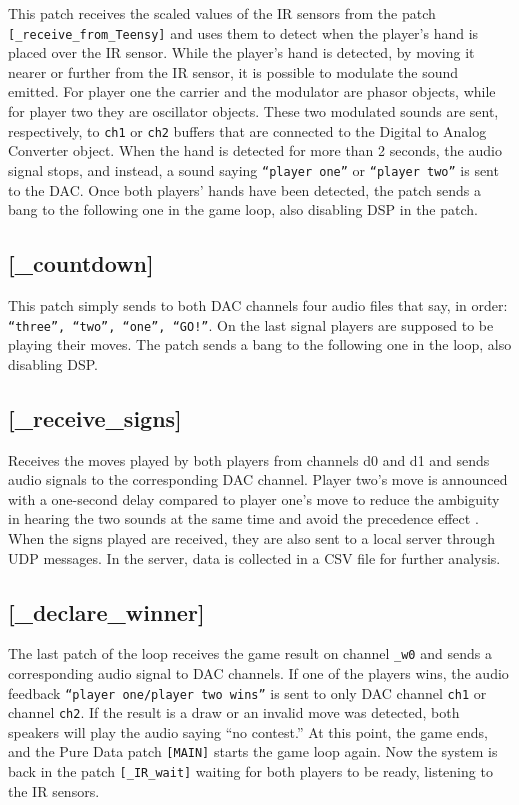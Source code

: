 \documentclass[11pt,a4paper]{report}
\begin{document}
This patch receives the scaled values of the IR sensors from the patch 
\texttt{[\_receive\_from\_Teensy]}
and uses them to detect when the player's hand is placed over the IR sensor. While the player's hand is detected, by moving it nearer or further from the IR sensor, it is possible to modulate the sound emitted. For player one the carrier and the modulator are phasor objects, while for player two they are oscillator objects. These two modulated sounds are sent, respectively, to \texttt{ch1} or \texttt{ch2} buffers that are connected to the Digital to Analog Converter object. When the hand is detected for more than 2 seconds, the audio signal stops, and instead, a sound saying \texttt{“player one”} or \texttt{“player two”} is sent to the DAC. Once both players' hands have been detected, the patch sends a bang to the following one in the game loop, also disabling DSP in the patch.

\subsection*{\textbf{[\_countdown]}}
This patch simply sends to both DAC channels four audio files that say, in order: \texttt{“three”, “two”, “one”, “GO!”}. On the last signal players are supposed to be playing their moves. The patch sends a bang to the following one in the loop, also disabling DSP.

\subsection*{\textbf{[\_receive\_signs]}}

Receives the moves played by both players from channels d0 and d1 and sends audio signals to the corresponding DAC channel. Player two's move is announced with a one-second delay compared to player one's move to reduce the ambiguity in hearing the two sounds at the same time and avoid the precedence effect \cite*{1}. When the signs played are received, they are also sent to a local server through UDP messages. In the server, data is collected in a CSV file for further analysis.

\subsection*{\textbf{[\_declare\_winner]}}
The last patch of the loop receives the game result on channel \texttt{\_w0} and sends a corresponding audio signal to DAC channels. If one of the players wins, the audio feedback \texttt{“player one/player two wins”} is sent to only DAC channel \texttt{ch1} or channel \texttt{ch2}. If the result is a draw or an invalid move was detected, both speakers will play the audio saying “no contest.” At this point, the game ends, and the Pure Data patch \texttt{[MAIN]} starts the game loop again. Now the system is back in the patch \texttt{[\_IR\_wait]} waiting for both players to be ready, listening to the IR sensors.
\end{document}
